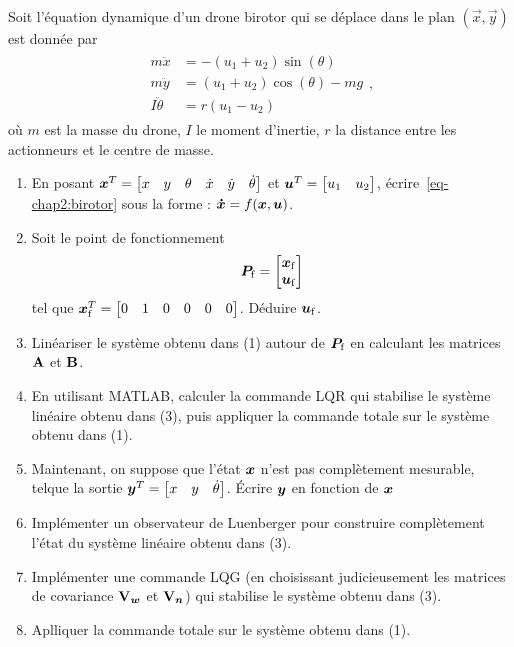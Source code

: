 \begin{tpe}
	Soit l'équation dynamique d'un drone birotor qui se déplace dans le plan $(\overset{\rightarrow}{x},\overset{\rightarrow}{y})$ est donnée par 
	\begin{align}\label{eq-chap2:birotor}
		\begin{split}
			m\ddot{x} &= -(u_1+u_2)\sin(\theta)\\
			m\ddot{y} &= (u_1+u_2)\cos(\theta)-mg\\
			I\ddot{\theta} &=r(u_1-u_2)
		\end{split},
	\end{align}
	où $m$ est la masse du drone, $I$ le moment d'inertie, $r$ la distance entre les actionneurs et le centre de masse. 
	\begin{enumerate}
		\item En posant $\bm{x}^T=\begin{bmatrix}
			x&y&\theta&\dot{x}&\dot{y}&\dot{\theta}
		\end{bmatrix}$ et $\bm{u}^T = \begin{bmatrix}
		u_1& u_2
		\end{bmatrix}$, écrire~\eqref{eq-chap2:birotor} sous la forme : $\bm{\dot{x}} = f(\bm{x},\bm{u})$.
		\item Soit le point de fonctionnement
		\begin{equation}
			\bm{P}_{\rm f} = \begin{bmatrix}
				\bm{x}_{\rm f} \\ \bm{u}_{\rm f}
			\end{bmatrix}
		\end{equation} 
		tel que $\bm{x}_{\rm f}^T = \begin{bmatrix}
			0&1&0&0&0&0
		\end{bmatrix}$. Déduire $\bm{u}_{\rm f}$. 
		\item Linéariser le système obtenu dans (1) autour de $\bm{P}_{\rm f}$ en calculant les matrices $\mathbf{A}$ et $\mathbf{B}$.
		\item En utilisant MATLAB, calculer la commande LQR qui stabilise le système linéaire obtenu dans (3), puis appliquer la commande totale sur le système obtenu dans (1).
		\item Maintenant, on suppose que l'état $\bm{x}$ n'est pas complètement mesurable, telque la sortie $\bm{y}^T = \begin{bmatrix}
			x&y&\dot{\theta}
		\end{bmatrix} $. Écrire $\bm{y}$ en fonction de $\bm{x}$
		\item Implémenter un observateur de Luenberger pour construire complètement l'état du système linéaire obtenu dans (3).
		\item Implémenter une commande LQG (en choisissant judicieusement les matrices de covariance $\mathbf{V}_{\bm w}$ et $\mathbf{V}_{\bm n}$) qui stabilise le système obtenu dans (3). 
		\item Aplliquer la commande totale sur le système obtenu dans (1).
	\end{enumerate}
\end{tpe}
